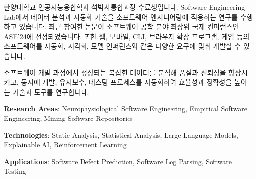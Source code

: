 \begin{cvletter}
    
    한양대학교 인공지능융합학과 석박사통합과정 수료생입니다. Software Engineering Lab에서 데이터 분석과 자동화 기술을 소프트웨어 엔지니어링에 적용하는 연구를 수행하고 있습니다. 최근 참여한 논문이 소프트웨어 공학 분야 최상위 국제 컨퍼런스인 ASE’24에 선정되었습니다. 또한 웹, 모바일, CLI, 브라우저 확장 프로그램, 게임 등의 소프트웨어를 자동화, 시각화, 모델 인퍼런스와 같은 다양한 요구에 맞춰 개발할 수 있습니다.

    

    소프트웨어 개발 과정에서 생성되는 복잡한 데이터를 분석해 품질과 신뢰성을 향상시키고, 동시에 개발, 유지보수, 테스팅 프로세스를 자동화하여 효율성과 정확성을 높이는 기술과 도구를 연구합니다.
    \vspace{2.0mm}
    \begin{cvitems}
        \item \textbf{Research Areas}: Neurophysiological Software Engineering, Empirical Software Engineering, Mining Software Repositories
        \item \textbf{Technologies}: Static Analysis, Statistical Analysis, Large Language Models, Explainable AI, Reinforcement Learning
        \item \textbf{Applications}: Software Defect Prediction, Software Log Parsing, Software Testing
    \end{cvitems}
    \vspace{2.0mm}
\end{cvletter}

